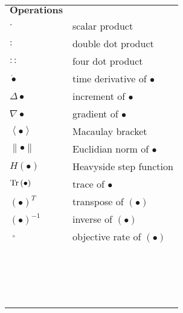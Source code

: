 \begin{table}[htb]
  \centering
    \begin{tabular}{p{3cm}p{10.5cm}}
    $\textbf{Operations}$ & \\
    $\cdot$  & scalar product \\
    $:$  & double dot product \\
    $::$  & four dot product \\
    ${\dot  \bullet }$  & time derivative of $\bullet$ \\
    ${\Delta  \bullet }$  & increment of $\bullet$ \\
    $\nabla \bullet$  & gradient of $\bullet$ \\
    $\left\langle  \bullet  \right\rangle$  & Macaulay bracket \\
    $\left\|  \bullet  \right\|$  & Euclidian norm of $\bullet$ \\
    $H\left(  \bullet  \right)$  & Heavyside step function \\
    $\rm{Tr}\left(  \bullet  \right)$  & trace of $\bullet$ \\
    ${\left(  \bullet  \right)^T}$  & transpose of $\left(  \bullet  \right)$ \\
    ${\left(  \bullet  \right)^{ - 1}}$  & inverse of $\left(  \bullet  \right)$ \\
    $\mathop {\left(  \bullet  \right)}\limits^ \circ$  & objective rate of $\left(  \bullet  \right)$ \\
    & \\
    & \\
    & \\
    & \\
    & \\
    & \\
    & \\
    & \\
    & \\
    & \\
    & \\
    & \\
    & \\
    & \\
    & \\
    & \\
    & \\
    \end{tabular}%
  \label{Tab:operations}%
\end{table}%
\renewcommand\arraystretch{1.0}